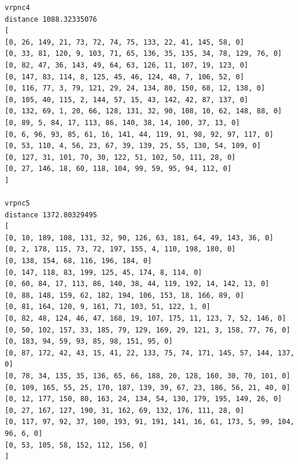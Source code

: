 \documentclass{article} %
\begin{document}
\begin{lstlisting}[breaklines, basicstyle=\tiny]
vrpnc4
distance 1088.32335076
[
[0, 26, 149, 21, 73, 72, 74, 75, 133, 22, 41, 145, 58, 0]
[0, 33, 81, 120, 9, 103, 71, 65, 136, 35, 135, 34, 78, 129, 76, 0]
[0, 82, 47, 36, 143, 49, 64, 63, 126, 11, 107, 19, 123, 0]
[0, 147, 83, 114, 8, 125, 45, 46, 124, 48, 7, 106, 52, 0]
[0, 116, 77, 3, 79, 121, 29, 24, 134, 80, 150, 68, 12, 138, 0]
[0, 105, 40, 115, 2, 144, 57, 15, 43, 142, 42, 87, 137, 0]
[0, 132, 69, 1, 20, 66, 128, 131, 32, 90, 108, 10, 62, 148, 88, 0]
[0, 89, 5, 84, 17, 113, 86, 140, 38, 14, 100, 37, 13, 0]
[0, 6, 96, 93, 85, 61, 16, 141, 44, 119, 91, 98, 92, 97, 117, 0]
[0, 53, 110, 4, 56, 23, 67, 39, 139, 25, 55, 130, 54, 109, 0]
[0, 127, 31, 101, 70, 30, 122, 51, 102, 50, 111, 28, 0]
[0, 27, 146, 18, 60, 118, 104, 99, 59, 95, 94, 112, 0]
]

vrpnc5
distance 1372.80329495
[
[0, 10, 189, 108, 131, 32, 90, 126, 63, 181, 64, 49, 143, 36, 0]
[0, 2, 178, 115, 73, 72, 197, 155, 4, 110, 198, 180, 0]
[0, 138, 154, 68, 116, 196, 184, 0]
[0, 147, 118, 83, 199, 125, 45, 174, 8, 114, 0]
[0, 60, 84, 17, 113, 86, 140, 38, 44, 119, 192, 14, 142, 13, 0]
[0, 88, 148, 159, 62, 182, 194, 106, 153, 18, 166, 89, 0]
[0, 81, 164, 120, 9, 161, 71, 103, 51, 122, 1, 0]
[0, 82, 48, 124, 46, 47, 168, 19, 107, 175, 11, 123, 7, 52, 146, 0]
[0, 50, 102, 157, 33, 185, 79, 129, 169, 29, 121, 3, 158, 77, 76, 0]
[0, 183, 94, 59, 93, 85, 98, 151, 95, 0]
[0, 87, 172, 42, 43, 15, 41, 22, 133, 75, 74, 171, 145, 57, 144, 137, 0]
[0, 78, 34, 135, 35, 136, 65, 66, 188, 20, 128, 160, 30, 70, 101, 0]
[0, 109, 165, 55, 25, 170, 187, 139, 39, 67, 23, 186, 56, 21, 40, 0]
[0, 12, 177, 150, 80, 163, 24, 134, 54, 130, 179, 195, 149, 26, 0]
[0, 27, 167, 127, 190, 31, 162, 69, 132, 176, 111, 28, 0]
[0, 117, 97, 92, 37, 100, 193, 91, 191, 141, 16, 61, 173, 5, 99, 104, 96, 6, 0]
[0, 53, 105, 58, 152, 112, 156, 0]
]
\end{lstlisting}
\end{document}
